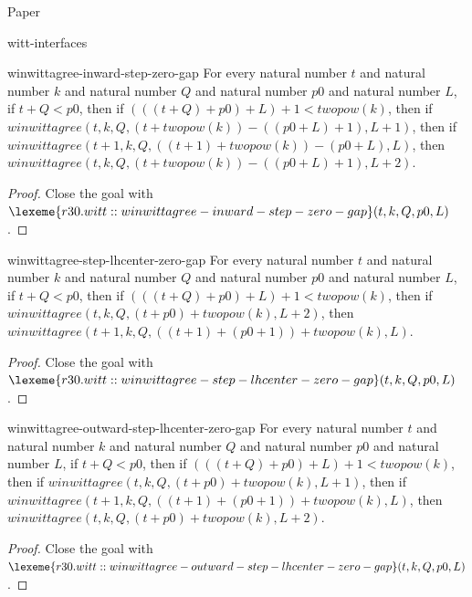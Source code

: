 \begin{lexlean}{Paper}
\begin{section}{witt-interfaces}
  \begin{theorem}{winwittagree-inward-step-zero-gap}
  For every natural number \(t\) and natural number \(k\) and natural number \(Q\) and natural number \(p0\) and natural number \(L\), if \(t + Q < p0\), then if \((((t + Q) + p0) + L) + 1 < twopow(k)\), then if \(winwittagree(t, k, Q, (t + twopow(k)) - ((p0 + L) + 1), L + 1)\), then if \(winwittagree(t + 1, k, Q, ((t + 1) + twopow(k)) - (p0 + L), L)\), then \(winwittagree(t, k, Q, (t + twopow(k)) - ((p0 + L) + 1), L + 2)\).
  \begin{proof}
  Close the goal with \(\lexeme{r30.witt::winwittagree-inward-step-zero-gap}(t, k, Q, p0, L)\).
  \end{proof}
  \end{theorem}

  \begin{theorem}{winwittagree-step-lhcenter-zero-gap}
  For every natural number \(t\) and natural number \(k\) and natural number \(Q\) and natural number \(p0\) and natural number \(L\), if \(t + Q < p0\), then if \((((t + Q) + p0) + L) + 1 < twopow(k)\), then if \(winwittagree(t, k, Q, (t + p0) + twopow(k), L + 2)\), then \(winwittagree(t + 1, k, Q, ((t + 1) + (p0 + 1)) + twopow(k), L)\).
  \begin{proof}
  Close the goal with \(\lexeme{r30.witt::winwittagree-step-lhcenter-zero-gap}(t, k, Q, p0, L)\).
  \end{proof}
  \end{theorem}

  \begin{theorem}{winwittagree-outward-step-lhcenter-zero-gap}
  For every natural number \(t\) and natural number \(k\) and natural number \(Q\) and natural number \(p0\) and natural number \(L\), if \(t + Q < p0\), then if \((((t + Q) + p0) + L) + 1 < twopow(k)\), then if \(winwittagree(t, k, Q, (t + p0) + twopow(k), L + 1)\), then if \(winwittagree(t + 1, k, Q, ((t + 1) + (p0 + 1)) + twopow(k), L)\), then \(winwittagree(t, k, Q, (t + p0) + twopow(k), L + 2)\).
  \begin{proof}
  Close the goal with \(\lexeme{r30.witt::winwittagree-outward-step-lhcenter-zero-gap}(t, k, Q, p0, L)\).
  \end{proof}
  \end{theorem}


\end{section}
\end{lexlean}
